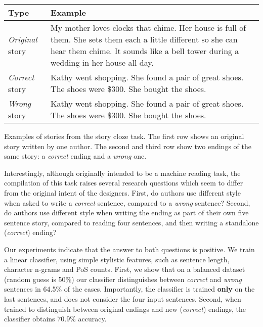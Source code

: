 \documentclass[11pt,a4paper]{article}
\begin{document}
\begin{table}[!t]
\small
\begin{tabular}{|p{.95cm}|p{6cm}|} \hline
{\bf Type} & {\bf Example} \\ \hline
{\it Original} story & My mother loves clocks that chime.	Her house is full of them.	She sets them each a little different so she can hear them chime.	It sounds like a bell tower during a wedding in her house all day.	{\color{blue}{When I visit I stop them or I'd never be able to sleep at night.}} \\ \hline
{\it Correct} story & Kathy went shopping.	She found a pair of great shoes.	The shoes were \$300.	She bought the shoes.	{\color{green}{She felt buyer's remorse after the purchase.}} \\ \hline
{\it Wrong} story & Kathy went shopping.	She found a pair of great shoes.	The shoes were \$300.	She bought the shoes.	{\color{red}{Kathy hated buying shoes.}} \\ \hline
\end{tabular}
\caption{\label{ROC-example}}
Examples of stories from the story cloze task. The first row shows an original story written by one author. 
The second and third row show two endings of the same story: a {\it correct} ending and a {\it wrong} one.
\end{table}


Interestingly, although originally intended to be a machine reading task, the compilation of this task raises several research questions which seem to differ from the original intent of the designers.
First, do authors use different style when asked to write a {\it correct} sentence, compared to a {\it wrong} sentence?
Second, do authors use different style when writing the ending as part of their own five sentence story, compared to reading four sentences, and then writing a standalone ({\it correct}) ending?

Our experiments indicate that the answer to both questions is positive. 
We train a linear classifier, using simple stylistic features, such as sentence length, character n-grams and PoS counts. 
First, we show that on a balanced dataset (random guess is 50\%) our classifier distinguishes between {\it correct} and {\it wrong} sentences in 64.5\% of the cases. 
Importantly, the classifier is trained {\bf only} on the last sentences, and does not consider the four input sentences.
Second, when trained to distinguish between original endings and new ({\it correct}) endings, the classifier obtains 70.9\% accuracy. 
\end{document}
